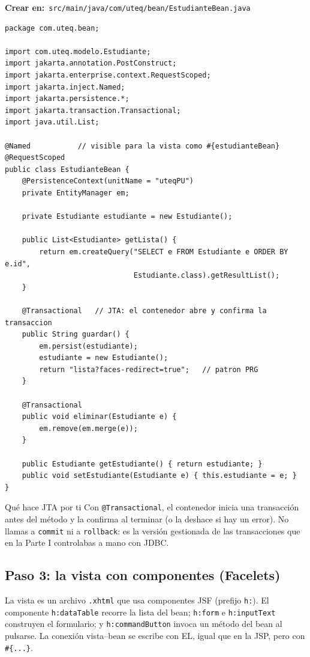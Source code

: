 \documentclass[11pt]{article}
\begin{document}
{\small\color{jwebazulo}\textbf{Crear en:}~}\texttt{src/\allowbreak{}main/\allowbreak{}java/\allowbreak{}com/\allowbreak{}uteq/\allowbreak{}bean/\allowbreak{}Estudiante\allowbreak{}Bean.\allowbreak{}java}\par\nobreak\vspace{-1pt}
\begin{cajacodigo}
\begin{lstlisting}[style=java]
package com.uteq.bean;

import com.uteq.modelo.Estudiante;
import jakarta.annotation.PostConstruct;
import jakarta.enterprise.context.RequestScoped;
import jakarta.inject.Named;
import jakarta.persistence.*;
import jakarta.transaction.Transactional;
import java.util.List;

@Named           // visible para la vista como #{estudianteBean}
@RequestScoped
public class EstudianteBean {
    @PersistenceContext(unitName = "uteqPU")
    private EntityManager em;

    private Estudiante estudiante = new Estudiante();

    public List<Estudiante> getLista() {
        return em.createQuery("SELECT e FROM Estudiante e ORDER BY e.id",
                              Estudiante.class).getResultList();
    }

    @Transactional   // JTA: el contenedor abre y confirma la transaccion
    public String guardar() {
        em.persist(estudiante);
        estudiante = new Estudiante();
        return "lista?faces-redirect=true";   // patron PRG
    }

    @Transactional
    public void eliminar(Estudiante e) {
        em.remove(em.merge(e));
    }

    public Estudiante getEstudiante() { return estudiante; }
    public void setEstudiante(Estudiante e) { this.estudiante = e; }
}
\end{lstlisting}
\end{cajacodigo}
\vspace{2pt}
\begin{cajatip}{Qué hace JTA por ti}
Con \texttt{@Transactional}, el contenedor inicia una transacción antes del método y la confirma al terminar (o la deshace si hay un error). No llamas a \texttt{commit} ni a \texttt{rollback}: es la versión gestionada de las transacciones que en la Parte I controlabas a mano con JDBC.\par
\end{cajatip}
\subsection{Paso 3: la vista con componentes (Facelets)}
La vista es un archivo \texttt{.\allowbreak{}xhtml} que usa componentes JSF (prefijo \texttt{h:\allowbreak{}}). El componente \texttt{h:\allowbreak{}data\allowbreak{}Table} recorre la lista del bean; \texttt{h:\allowbreak{}form} e \texttt{h:\allowbreak{}input\allowbreak{}Text} construyen el formulario; y \texttt{h:\allowbreak{}command\allowbreak{}Button} invoca un método del bean al pulsarse. La conexión vista–bean se escribe con EL, igual que en la JSP, pero con \texttt{\#\{.\allowbreak{}.\allowbreak{}.\allowbreak{}\}}.
\end{document}
